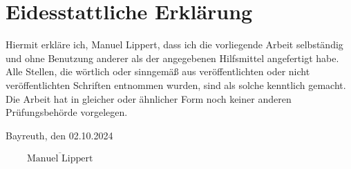\newpage
\chapter*{Eidesstattliche Erklärung}
\label{sec:eid}
\thispagestyle{empty}

\vspace*{0.1cm}
Hiermit erkläre ich, Manuel Lippert, dass ich die vorliegende Arbeit selbständig und ohne Benutzung anderer als der angegebenen Hilfsmittel angefertigt habe.
\bigskip
Alle Stellen, die wörtlich oder sinngemäß aus veröffentlichten oder nicht veröffentlichten Schriften entnommen wurden, sind als solche kenntlich gemacht.
\bigskip
Die Arbeit hat in gleicher oder ähnlicher Form noch keiner anderen Prüfungsbehörde vorgelegen.
\vspace{3cm}

\noindent Bayreuth, den 02.10.2024
\begin{flushright}
$\overline{~~~~~~~~~~\mbox{Manuel Lippert}~~~~~~~~~~}$
\end{flushright}